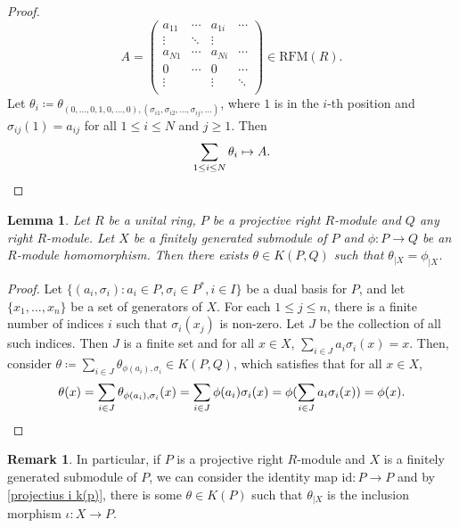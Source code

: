 \documentclass[11pt]{amsart}
\numberwithin{equation}{section}
\newtheorem{lma}{Lemma}[section]
\theoremstyle{definition}
\newtheorem{rmk}[rmkCt]{Remark}
\theoremstyle{plain}
\theoremstyle{definition}
\begin{document}
\begin{proof}
\begin{equation*}
A = \begin{pmatrix}
    a_{11} & \cdots & a_{1i} & \cdots \\
    \vdots & \ddots & \vdots &  \\
    a_{N1} & \cdots & a_{Ni} & \cdots \\
    0 & \cdots & 0 & \cdots \\
    \vdots &  & \vdots & \ddots \\
\end{pmatrix} \in \mathrm{RFM}(R).
\end{equation*}
Let $\theta_i \coloneqq \theta_{(0, \dots, 0, 1, 0, \dots, 0), (\sigma_{i1}, \sigma_{i2}, \dots, \sigma_{ij}, \dots)}$, where $1$ is in the $i$-th position and $\sigma_{ij}(1) = a_{ij}$ for all $1 \leq i \leq N$ and $j \geq 1$. Then 
\begin{equation*}
\sum_{1 \leq i \leq N} \theta_{i} \mapsto A.\qedhere
\end{equation*} 
\end{proof}


\begin{lma} \label{projectius i k(p)}
Let $R$ be a unital ring, $P$ be a projective right $R$-module and $Q$ any right $R$-module. Let $X$ be a finitely generated submodule of $P$ and $\phi \colon P \rightarrow Q$ be an $R$-module homomorphism. Then there exists $\theta \in K(P,Q)$ such that $\theta_{|X} = \phi_{|X}$. 
\end{lma}

\begin{proof}
Let $\{ (a_i, \sigma_i) \colon a_i \in P, \sigma_i \in P^*, i \in I\}$ be a dual basis for $P$, and let $\{x_1, \dots, x_n \}$ be a set of generators of $X$. For each $1\leq j\leq n$, there is a finite number of indices $i$ such that $\sigma_i(x_j)$ is non-zero. Let $J$ be the collection of all such indices. Then $J$ is a finite set and for all $x \in X$, $\sum_{i \in J} a_i\sigma_i(x) = x$. Then, consider $\theta \coloneqq \sum_{i \in J} \theta_{\phi(a_i), \sigma_i} \in K(P, Q)$, which satisfies that for all $x \in X$,
\begin{equation*}
\theta(x) = \sum_{i \in J} \theta_{\phi(a_i), \sigma_i}(x) = \sum_{i \in J} \phi(a_i)\sigma_i(x) = \phi (\sum_{i \in J} a_i\sigma_i(x)) = \phi(x).\qedhere
\end{equation*}
\end{proof}


\begin{rmk} \label{submoduls de projectius i k(p)}
In particular, if $P$ is a projective right $R$-module and $X$ is a finitely generated submodule of $P$, we can consider the identity map $\mathrm{id}\colon P \rightarrow P$ and by~ \autoref{projectius i k(p)}, there is some $\theta \in K(P)$ such that $\theta_{|X}$ is the inclusion morphism $\iota \colon X \rightarrow{} P$. 

\end{rmk}
\end{document}
